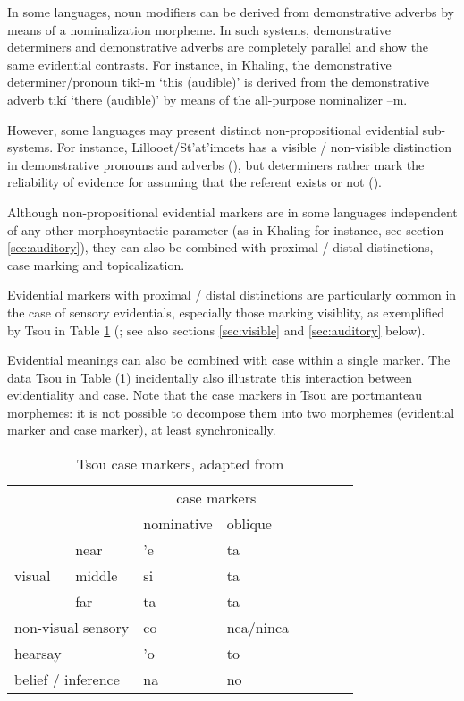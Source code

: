 \documentclass[oneside,a4paper,11pt]{article}
\newcommand{\ipa}[1]{{\phon \mbox{#1}}} %
\begin{document}
In some languages, noun modifiers can be derived from demonstrative adverbs by means of a nominalization morpheme. In such systems, demonstrative determiners and demonstrative adverbs are completely parallel and show the same evidential contrasts. For instance, in Khaling, the demonstrative determiner/pronoun \ipa{tikî-m} `this (audible)' is derived from the demonstrative adverb \ipa{tikí} `there (audible)' by means of the all-purpose nominalizer \ipa{--m}.

However, some languages may present distinct non-propositional evidential sub-systems. For instance, Lillooet/St'at'imcets has a visible / non-visible distinction in demonstrative pronouns and adverbs (\citealt[169, 171]{eijk97lillooet}), but determiners rather mark the reliability of evidence for assuming that the referent exists or not (\citealt{matthewson98determiners, gutierrez12determiners}).

Although non-propositional evidential markers are in some languages independent of any other morphosyntactic parameter (as in Khaling for instance, see section \ref{sec:auditory}), they can also be combined with  proximal / distal distinctions, case marking and topicalization.

Evidential markers with proximal / distal distinctions are particularly common in the case of sensory evidentials, especially those marking visiblity, as exemplified by Tsou in Table \ref{tab:tsou} (\citealt[54]{yang00tsou.case}; see also sections \ref{sec:visible} and \ref{sec:auditory} below). 

Evidential meanings can also be combined with case within a single marker. The data Tsou in Table (\ref{tab:tsou}) incidentally also illustrate this interaction between evidentiality and case. Note that the case markers in Tsou are portmanteau morphemes: it is not possible to decompose them into two morphemes (evidential marker and case marker), at least synchronically.  
 
\begin{table}[H]
 \caption{Tsou case markers, adapted from \citet[54]{yang00tsou.case}} \centering \label{tab:tsou}
\begin{tabular}{llllllll}
\toprule
	 & 	 & 	\multicolumn{2}{c}{case markers } 	 \\	
	 & 	 & 	nominative & 	oblique \\	
\midrule
	 & 	near & 	\ipa{'e} & 	\ipa{ta} \\ 	
visual	 & 	middle & 	\ipa{si} & 	\ipa{ta}  \\ 	
	 & 	far & 	\ipa{ta} & 	\ipa{ta}  \\ 	
\multicolumn{2}{l}{non-visual sensory}  	 & 	\ipa{co} & 	\ipa{nca/ninca} \\ 	
	 \midrule
\multicolumn{2}{l}{hearsay}	 & 	\ipa{'o} & 	\ipa{to} \\ 	
\multicolumn{2}{l}{belief / inference} 	 & 	\ipa{na} & 	\ipa{no} \\ 	
\bottomrule
\end{tabular}
\end{table} 
\end{document}
